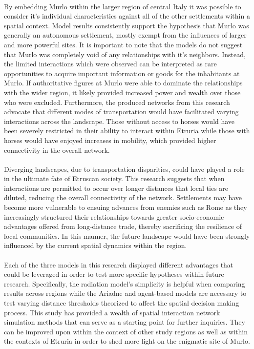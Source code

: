 \documentclass[12pt,a4paper]{thesis}
\begin{document}
\paragraph{} 
By embedding Murlo within the larger region of central Italy it was possible to consider it's individual characteristics against all of the other settlements within a spatial context. Model results consistently support the hypothesis that Murlo was generally an autonomous settlement, mostly exempt from the influences of larger and more powerful sites. It is important to note that the models do not suggest that Murlo was completely void of any relationships with it's neighbors. Instead, the limited interactions which were observed can be interpreted as rare opportunities to acquire important information or goods for the inhabitants at Murlo. If authoritative figures at Murlo were able to dominate the relationships with the wider region, it likely provided increased power and wealth over those who were excluded. Furthermore, the produced networks from this research advocate that different modes of transportation would have facilitated varying interactions across the landscape. Those without access to horses would have been severely restricted in their ability to interact within Etruria while those with horses would have enjoyed increases in mobility, which provided higher connectivity in the overall network.         

 
\paragraph{}
Diverging landscapes, due to transportation disparities, could have played a role in the ultimate fate of Etruscan society. This research suggests that when interactions are permitted to occur over longer distances that local ties are diluted, reducing the overall connectivity of the network. Settlements may have become more vulnerable to ensuing advances from enemies such as Rome as they increasingly structured their relationships towards greater socio-economic advantages offered from long-distance trade, thereby sacrificing the resilience of local communities. In this manner, the future landscape would have been strongly influenced by the current spatial dynamics within the region.    


\paragraph{}
Each of the three models in this research displayed different advantages that could be leveraged in order to test more specific hypotheses within future research. Specifically, the radiation model's simplicity is helpful when comparing results across regions while the Ariadne and agent-based models are necessary to test varying distance thresholds theorized to affect the spatial decision making process. This study has provided a wealth of spatial interaction network simulation methods that can serve as a starting point for further inquiries. They can be improved upon within the context of other study regions as well as within the contexts of Etruria in order to shed more light on the enigmatic site of Murlo. 
\end{document}
